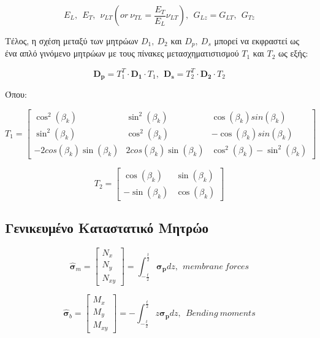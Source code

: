\[E_{L},\ \ E_{T},\ \ \nu_{LT}\left( or\ \nu_{TL} = \frac{E_{T}}{E_{L}}\nu_{LT} \right),\ \ G_{Lz} = G_{LT},\ \ G_{Tz}\]

Τέλος, η σχέση μεταξύ των μητρώων $D_{1},\ D_{2}$ και $D_{p},\ D_{s}$ μπορεί να εκφραστεί ως ένα απλό γινόμενο μητρώων με τους πίνακες μετασχηματιστισμού $T_{1}$ και $T_{2}$ ως εξής:

\begin{equation}    
\mathbf{D_{p}} = T_{1}^{T} \cdot \mathbf{D_{1}} \cdot T_{1},\ \ \mathbf{D_{s}} = T_{2}^{T} \cdot \mathbf{D_{2}} \cdot T_{2}
\end{equation}

Όπου:

\[T_{1} = \begin{bmatrix}
\cos^{2}\left( \beta_{k} \right) & \sin^{2}\left( \beta_{k} \right) & \cos\left( \beta_{k} \right)sin(\beta_{k}) \\
\sin^{2}\left( \beta_{k} \right) & \cos^{2}\left( \beta_{k} \right) & - \cos\left( \beta_{k} \right)sin(\beta_{k}) \\
 - {2cos}{\left( \beta_{k} \right)\sin\left( \beta_{k} \right)} & {2cos}{\left( \beta_{k} \right)\sin\left( \beta_{k} \right)} & \cos^{2}\left( \beta_{k} \right) - \sin^{2}\left( \beta_{k} \right)
\end{bmatrix}\]

\[T_{2} = \begin{bmatrix}
\cos\left( \beta_{k} \right) & \sin\left( \beta_{k} \right) \\
 - \sin\left( \beta_{k} \right) & \cos\left( \beta_{k} \right)
\end{bmatrix}\]


\subsection{Γενικευμένο Καταστατικό Μητρώο}
\label{generalized-constitutive-matrix}
\begin{equation}
{\hat{\boldsymbol{\sigma}}}_{m} = \begin{bmatrix}
N_{x} \\
N_{y} \\
N_{xy}
\end{bmatrix} = \int_{- \frac{t}{2}}^{\frac{t}{2}}{\boldsymbol{\sigma}_{\mathbf{p}}dz},\ \ membrane\ forces
\end{equation}

\begin{equation}    
{\hat{\boldsymbol{\sigma}}}_{b} = \begin{bmatrix}
M_x \\
M_y \\
M_{xy}
\end{bmatrix} = - \int_{- \frac{t}{2}}^{\frac{t}{2}}{z\boldsymbol{\sigma}_{\mathbf{p}}dz},\ \ Bending\ moments
\end{equation}

